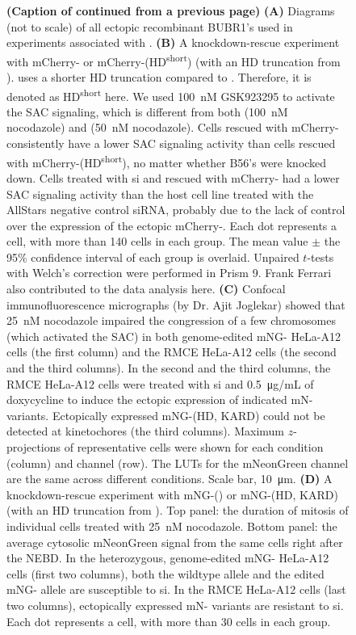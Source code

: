 \begin{figure}
  \noindent\justifying \textbf{(Caption of  continued from a previous page)} \textbf{(A)} Diagrams (not to scale) of all ectopic recombinant BUBR1's used in experiments associated with . \textbf{(B)} A  knockdown-rescue experiment with mCherry- or mCherry-(\textDelta{}HD\textsuperscript{short}) (with an HD truncation from \cite{BubR1TwoPools}). \cite{BubR1TwoPools} uses a shorter HD truncation compared to \cite{BubBiochem}. Therefore, it is denoted as \textDelta{}HD\textsuperscript{short} here. We used \SI{100}{nM} GSK923295 to activate the SAC signaling, which is different from both \cite{BubR1TwoPools} (\SI{100}{nM} nocodazole) and \cite{BubBiochem} (\SI{50}{nM} nocodazole). Cells rescued with mCherry- consistently have a lower SAC signaling activity than cells rescued with mCherry-(\textDelta{}HD\textsuperscript{short}), no matter whether B56's were knocked down. Cells treated with si and rescued with mCherry- had a lower SAC signaling activity than the host cell line treated with the AllStars negative control siRNA, probably due to the lack of control over the expression of the ectopic mCherry-. Each dot represents a cell, with more than 140 cells in each group. The mean value $\pm$ the 95\% confidence interval of each group is overlaid. Unpaired $t$-tests with Welch's correction were performed in Prism 9. Frank Ferrari also contributed to the data analysis here. \textbf{(C)} Confocal immunofluorescence micrographs (by Dr. Ajit Joglekar) showed that \SI{25}{nM} nocodazole impaired the congression of a few chromosomes (which activated the SAC) in both genome-edited mNG- HeLa-A12 cells (the first column) and the RMCE HeLa-A12 cells (the second and the third columns). In the second and the third columns, the RMCE HeLa-A12 cells were treated with si and \SI{0.5}{\micro g/mL} of doxycycline to induce the ectopic expression of indicated mN- variants. Ectopically expressed mNG-(\textDelta{}HD, \textDelta{}KARD) could not be detected at kinetochores (the third columns). Maximum $z$-projections of representative cells were shown for each condition (column) and channel (row). The LUTs for the mNeonGreen channel are the same across different conditions. Scale bar, \SI{10}{\micro m}. \textbf{(D)} A  knockdown-rescue experiment with mNG-() or mNG-(\textDelta{}HD, \textDelta{}KARD) (with an HD truncation from \cite{BubBiochem}). Top panel: the duration of mitosis of individual cells treated with \SI{25}{nM} nocodazole. Bottom panel: the average cytosolic mNeonGreen signal from the same cells right after the NEBD. In the heterozygous, genome-edited mNG- HeLa-A12 cells (first two columns), both the wildtype allele and the edited mNG- allele are susceptible to si. In the RMCE HeLa-A12 cells (last two columns), ectopically expressed mN- variants are resistant to si. Each dot represents a cell, with more than 30 cells in each group. 
\end{figure}
